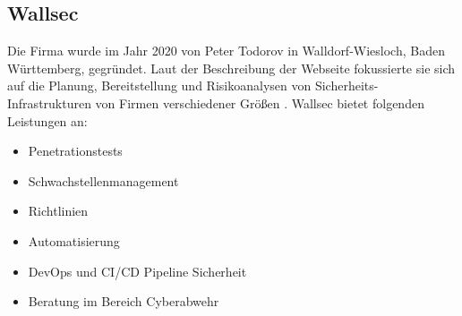 \subsection{Wallsec}
Die Firma wurde im Jahr 2020 von Peter Todorov in Walldorf-Wiesloch, Baden Württemberg, gegründet. Laut der Beschreibung der Webseite fokussierte sie sich auf die Planung, Bereitstellung und Risikoanalysen von Sicherheits-Infrastrukturen von Firmen verschiedener Größen \citep{Wallsec}. Wallsec bietet folgenden Leistungen an:

\begin{itemize}
   \item Penetrationstests
   \item Schwachstellenmanagement
   \item Richtlinien
   \item Automatisierung
   \item DevOps und CI/CD Pipeline Sicherheit
   \item Beratung im Bereich Cyberabwehr
\end{itemize}








